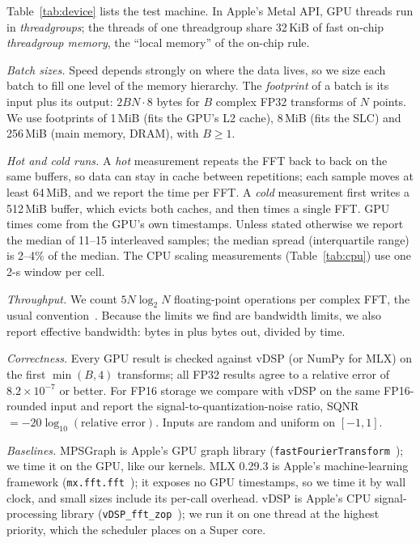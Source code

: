 \documentclass[conference]{IEEEtran}
\begin{document}
Table~\ref{tab:device} lists the test machine. In Apple's Metal API, GPU threads run in
\emph{threadgroups}; the threads of one threadgroup share 32\,KiB of fast on-chip \emph{threadgroup
memory}, the ``local memory'' of the on-chip rule.

\textit{Batch sizes.} Speed depends strongly on where the data lives, so we size each batch to fill one
level of the memory hierarchy. The \emph{footprint} of a batch is its input plus its output: $2BN\cdot8$
bytes for $B$ complex FP32 transforms of $N$ points. We use footprints of 1\,MiB (fits the GPU's L2
cache), 8\,MiB (fits the SLC) and 256\,MiB (main memory, DRAM), with $B\ge1$.

\textit{Hot and cold runs.} A \emph{hot} measurement repeats the FFT back to back on the same buffers,
so data can stay in cache between repetitions; each sample moves at least 64\,MiB, and we report the
time per FFT. A \emph{cold} measurement first writes a 512\,MiB buffer, which evicts both caches, and
then times a single FFT. GPU times come from the GPU's own timestamps. Unless stated otherwise we report
the median of 11--15 interleaved samples; the median spread (interquartile range) is 2--4\% of the
median. The CPU scaling measurements (Table~\ref{tab:cpu}) use one 2-s window per cell.

\textit{Throughput.} We count $5N\log_2N$ floating-point operations per complex FFT, the usual
convention~\cite{bergach2026fft}. Because the limits we find are bandwidth limits, we also report
effective bandwidth: bytes in plus bytes out, divided by time.

\textit{Correctness.} Every GPU result is checked against vDSP (or NumPy for MLX) on the first
$\min(B,4)$ transforms; all FP32 results agree to a relative error of $8.2\times10^{-7}$ or better.
For FP16 storage we compare with vDSP on the same FP16-rounded input and report the
signal-to-quantization-noise ratio, SQNR $=-20\log_{10}(\text{relative error})$. Inputs are random and
uniform on $[-1,1]$.

\textit{Baselines.} MPSGraph is Apple's GPU graph library (\texttt{fastFourierTransform}~\cite{apple_mpsgraph});
we time it on the GPU, like our kernels. MLX 0.29.3 is Apple's machine-learning framework
(\texttt{mx.fft.fft}~\cite{mlx2023}); it exposes no GPU timestamps, so we time it by wall clock, and
small sizes include its per-call overhead. vDSP is Apple's CPU signal-processing library
(\texttt{vDSP\_fft\_zop}~\cite{apple_vdsp_fft}); we run it on one thread at the highest priority, which
the scheduler places on a Super core.
\end{document}
